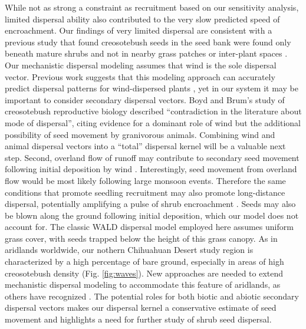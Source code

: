 \documentclass[11pt]{article}\usepackage[]{graphicx}\usepackage[usenames,dvipsnames]{xcolor}
\begin{document}
While not as strong a constraint as recruitment based on our sensitivity analysis, limited dispersal ability also contributed to the very slow predicted speed of encroachment. 
Our findings of very limited dispersal are consistent with a previous study that found creosotebush seeds in the seed bank were found only beneath mature shrubs and not in nearby grass patches or inter-plant spaces \citep{moreno2016seed}. 
Our mechanistic dispersal modeling assumes that wind is the sole dispersal vector. 
Previous work suggests that this modeling approach can accurately predict dispersal patterns for wind-dispersed plants \citep{skarpaas2007dispersal}, yet in our system it may be important to consider secondary dispersal vectors. 
Boyd and Brum's \citeyear{boyd1983postdispersal} study of creosotebush reproductive biology described ``contradiction in the literature about mode of dispersal'', citing evidence for a dominant role of wind but the additional possibility of seed movement by granivorous animals. 
Combining wind and animal dispersal vectors into a ``total'' dispersal kernel \citep{rogers2019total} will be a valuable next step. 
Second, overland flow of runoff may contribute to secondary seed movement following initial deposition by wind \citep{thompson2014secondary}. 
Interestingly, seed movement from overland flow would be most likely following large monsoon events. 
Therefore the same conditions that promote seedling recruitment may also promote long-distance dispersal, potentially amplifying a pulse of shrub encroachment \citep{ellner2012temporally}. 
Seeds may also be blown along the ground following initial deposition, which our model does not account for.
The classic WALD dispersal model employed here assumes uniform grass cover, with seeds trapped below the height of this grass canopy. 
As in aridlands worldwide, our nothern Chihuahuan Desert study region is characterized by a high percentage of bare ground, especially in areas of high creosotebush density (Fig. \ref{fig:waves}). 
New approaches are needed to extend mechanistic dispersal modeling to accommodate this feature of aridlands, as others have recognized \citep{thompson2014secondary}. 
The potential roles for both biotic and abiotic secondary dispersal vectors makes our dispersal kernel a conservative estimate of seed movement and highlights a need for further study of shrub seed dispersal. 
\end{document}
